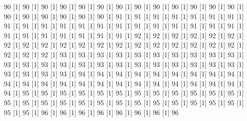 \documentclass[12pt]{article}
\begin{document}
\begin{Schunk}
\begin{Soutput}
[1] 90%
[1] 90%
[1] 90%
[1] 90%
[1] 90%
[1] 90%
[1] 90%
[1] 90%
[1] 90%
[1] 90%
[1] 90%
[1] 90%
[1] 90%
[1] 90%
[1] 90%
[1] 90%
[1] 90%
[1] 90%
[1] 90%
[1] 91%
[1] 91%
[1] 91%
[1] 91%
[1] 91%
[1] 91%
[1] 91%
[1] 91%
[1] 91%
[1] 91%
[1] 91%
[1] 91%
[1] 91%
[1] 91%
[1] 91%
[1] 91%
[1] 91%
[1] 91%
[1] 91%
[1] 91%
[1] 91%
[1] 91%
[1] 91%
[1] 91%
[1] 91%
[1] 91%
[1] 91%
[1] 92%
[1] 92%
[1] 92%
[1] 92%
[1] 92%
[1] 92%
[1] 92%
[1] 92%
[1] 92%
[1] 92%
[1] 92%
[1] 92%
[1] 92%
[1] 92%
[1] 92%
[1] 92%
[1] 92%
[1] 92%
[1] 92%
[1] 92%
[1] 92%
[1] 92%
[1] 93%
[1] 93%
[1] 93%
[1] 93%
[1] 93%
[1] 93%
[1] 93%
[1] 93%
[1] 93%
[1] 93%
[1] 93%
[1] 93%
[1] 93%
[1] 93%
[1] 93%
[1] 93%
[1] 93%
[1] 93%
[1] 93%
[1] 93%
[1] 93%
[1] 93%
[1] 93%
[1] 93%
[1] 93%
[1] 93%
[1] 93%
[1] 94%
[1] 94%
[1] 94%
[1] 94%
[1] 94%
[1] 94%
[1] 94%
[1] 94%
[1] 94%
[1] 94%
[1] 94%
[1] 94%
[1] 94%
[1] 94%
[1] 94%
[1] 94%
[1] 94%
[1] 94%
[1] 94%
[1] 94%
[1] 94%
[1] 94%
[1] 94%
[1] 95%
[1] 95%
[1] 95%
[1] 95%
[1] 95%
[1] 95%
[1] 95%
[1] 95%
[1] 95%
[1] 95%
[1] 95%
[1] 95%
[1] 95%
[1] 95%
[1] 95%
[1] 95%
[1] 95%
[1] 95%
[1] 95%
[1] 95%
[1] 95%
[1] 95%
[1] 95%
[1] 95%
[1] 95%
[1] 95%
[1] 95%
[1] 96%
[1] 96%
[1] 96%
[1] 96%
[1] 96%
[1] 96%
[1] 96%
[1] 96%

\end{Soutput}
\end{Schunk}
\end{document}
